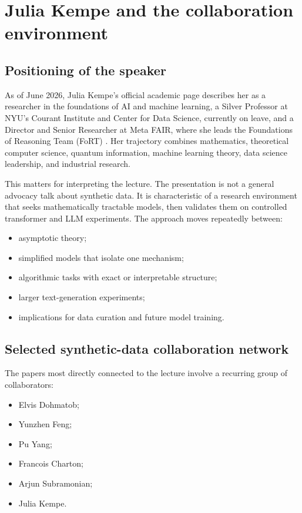 \section{Julia Kempe and the collaboration environment}

\subsection{Positioning of the speaker}

As of June 2026, Julia Kempe's official academic page describes her as a researcher in the foundations of AI and machine learning, a Silver Professor at NYU's Courant Institute and Center for Data Science, currently on leave, and a Director and Senior Researcher at Meta FAIR, where she leads the Foundations of Reasoning Team (FoRT) \citep{kempebio2026,kempecv2026}. Her trajectory combines mathematics, theoretical computer science, quantum information, machine learning theory, data science leadership, and industrial research.

This matters for interpreting the lecture. The presentation is not a general advocacy talk about synthetic data. It is characteristic of a research environment that seeks mathematically tractable models, then validates them on controlled transformer and LLM experiments. The approach moves repeatedly between:

\begin{itemize}[leftmargin=*]
  \item asymptotic theory;
  \item simplified models that isolate one mechanism;
  \item algorithmic tasks with exact or interpretable structure;
  \item larger text-generation experiments;
  \item implications for data curation and future model training.
\end{itemize}

\subsection{Selected synthetic-data collaboration network}

The papers most directly connected to the lecture involve a recurring group of collaborators:

\begin{itemize}[leftmargin=*]
  \item Elvis Dohmatob;
  \item Yunzhen Feng;
  \item Pu Yang;
  \item Francois Charton;
  \item Arjun Subramonian;
  \item Julia Kempe.
\end{itemize}

